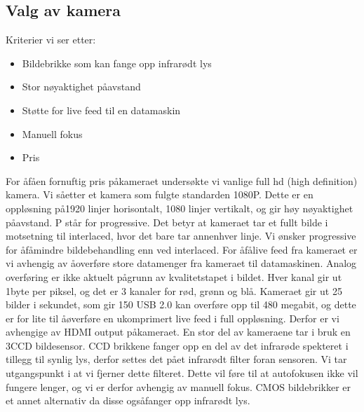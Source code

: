 	\subsection{Valg av kamera}
	
		Kriterier vi ser etter:
		
		\begin{itemize}
			\item Bildebrikke som kan fange opp infrar\o dt lys
			\item Stor n\o yaktighet p\aa avstand
			\item St\o tte for live feed til en datamaskin
			\item Manuell fokus
			\item Pris
		\end{itemize}
		
		 
		For \aa \space f\aa \space en fornuftig pris p\aa \space kameraet unders\o kte vi vanlige full hd (high definition) kamera. Vi s\aa \space etter et kamera som fulgte standarden 1080P. Dette er en oppl\o sning p\aa 1920 linjer horisontalt, 1080 linjer vertikalt, og gir h\o y n\o yaktighet p\aa avstand. P st\aa r for progressive. Det betyr at kameraet tar et fullt bilde i motsetning til interlaced, hvor det bare tar annenhver linje. Vi \o nsker progressive for \aa \space f\aa mindre bildebehandling enn ved interlaced. For \aa \space f\aa live feed fra kameraet er vi avhengig av \aa \space overf\o re store datamenger fra kameraet til datamaskinen. Analog overf\o ring er ikke aktuelt p\aa \space grunn av kvalitetstapet i bildet. Hver kanal gir ut 1byte per piksel, og det er 3 kanaler for r\o d, gr\o nn og bl\aa . Kameraet gir ut 25 bilder i sekundet, som gir 150 USB 2.0 kan overf\o re opp til 480 megabit, og dette er for lite til \aa \space \o verf\o re en ukomprimert live feed i full oppl\o sning. Derfor er vi avhengige av HDMI output p\aa kameraet. En stor del av kameraene tar i bruk en 3CCD bildesensor. CCD brikkene fanger opp en del av det infrar\o de spekteret i tillegg til synlig lys, derfor settes det p\aa et infrar\o dt filter foran sensoren. Vi tar utgangspunkt i at vi fjerner dette filteret. Dette vil f\o re til at autofokusen ikke vil fungere lenger, og vi er derfor avhengig av manuell fokus. CMOS bildebrikker er et annet alternativ da disse ogs\aa fanger opp infrar\o dt lys.
		
